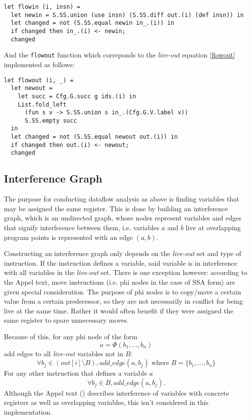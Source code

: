 \documentclass{article}
\begin{document}
\begin{verbatim}
let flowin (i, insn) =
  let newin = S.SS.union (use insn) (S.SS.diff out.(i) (def insn)) in
  let changed = not (S.SS.equal newin in_.(i)) in
  if changed then in_.(i) <- newin;
  changed
\end{verbatim}
And the \texttt{flowout} function which correponds to the \textit{live-out} equation \eqref{flowout} implemented as follows:
\begin{verbatim}
let flowout (i, _) =
  let newout =
    let succ = Cfg.G.succ g ids.(i) in
    List.fold_left
      (fun s v -> S.SS.union s in_.(Cfg.G.V.label v))
      S.SS.empty succ
  in
  let changed = not (S.SS.equal newout out.(i)) in
  if changed then out.(i) <- newout;
  changed
\end{verbatim}


\subsection{Interference Graph}

The purpose for conducting dataflow analysis as above is finding variables that may be assigned the same register. This is done by building an interference graph, which is an undirected graph, whose nodes represent variables and edges that signify interference between them, i.e. variables \(a\) and \(b\) live at overlapping program points is represented with an edge \((a,b)\).


Constructing an interference graph only depends on the \textit{live-out} set and type of instruction. If the instruction defines a variable, said variable is in interference with all variables in the \textit{live-out} set. There is one exception however: according to the Appel text, move instructions (i.e. phi nodes in the case of SSA form) are given special consideration. The purpose of phi nodes is to copy/move a certain value from a certain predecessor, so they are not necessarily in conflict for being live at the same time. Rather it would often benefit if they were assigned the same register to spare unnecessary moves. %


Because of this, for any phi node of the form 
\[
  a = \Phi (b_1, ..., b_n)
\]
add edges to all \textit{live-out} variables not in \(B\):
\[
  \forall b_j \in (\mathit{out}[i] \setminus B), \mathit{add\_edge}(a, b_j) \text{ where } B = \{b_1, ..., b_n\}
\]
For any other instruction that defines a variable \(a\)
\[
  \forall b_j \in B, \mathit{add\_edge}(a, b_j).
\]
Although the Appel text (\cite{tiger}) describes interference of variables with concrete registers as well as overlapping variables, this isn't considered in this implementation.
\end{document}
